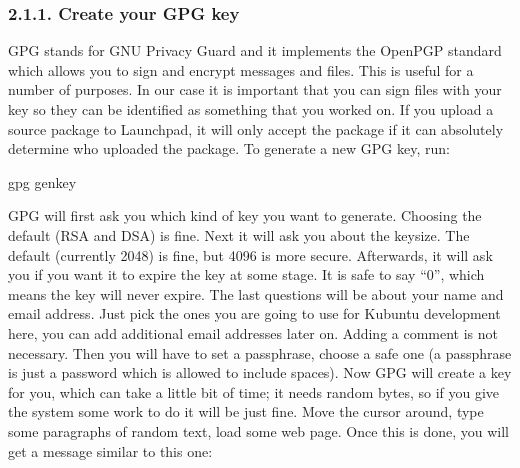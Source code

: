 \documentclass[letterpaper,10pt,english]{sphinxmanual}
\begin{document}
\subsubsection{2.1.1. Create your GPG key}
\label{\detokenize{docs/packaging_guide/getting_started:create-your-gpg-key}}
GPG stands for GNU Privacy Guard and it implements the OpenPGP standard which allows you to sign and encrypt messages and files. This is useful for a number of purposes. In our case it is important that you can sign files with your key so they can be identified as something that you worked on. If you upload a source package to Launchpad, it will only accept the package if it can absolutely determine who uploaded the package.
To generate a new GPG key, run:

\begin{sphinxVerbatim}[commandchars=\\\{\}]
\PYGZdl{} gpg \PYGZhy{}\PYGZhy{}gen\PYGZhy{}key
\end{sphinxVerbatim}

GPG will first ask you which kind of key you want to generate. Choosing the default (RSA and DSA) is fine. Next it will ask you about the keysize. The default (currently 2048) is fine, but 4096 is more secure. Afterwards, it will ask you if you want it to expire the key at some stage. It is safe to say “0”, which means the key will never expire. The last questions will be about your name and email address. Just pick the ones you are going to use for Kubuntu development here, you can add additional email addresses later on. Adding a comment is not necessary. Then you will have to set a passphrase, choose a safe one (a passphrase is just a password which is allowed to include spaces).
Now GPG will create a key for you, which can take a little bit of time; it needs random bytes, so if you give the system some work to do it will be just fine. Move the cursor around, type some paragraphs of random text, load some web page.
Once this is done, you will get a message similar to this one:

\begin{sphinxVerbatim}[commandchars=\\\{\}]
    
                   
     
    
\end{sphinxVerbatim}
\end{document}
